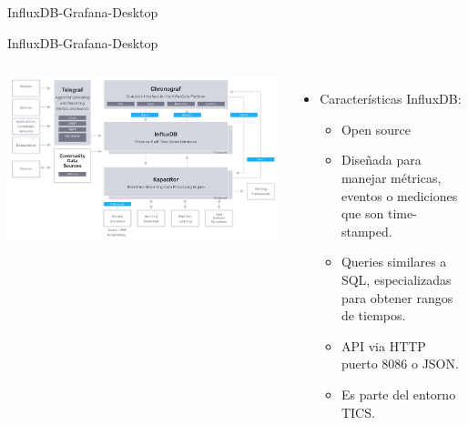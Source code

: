 \documentclass[aspectratio= 43]{beamer}
\begin{document}
\begin{frame}{InfluxDB-Grafana-Desktop}
\end{frame}

\begin{frame}{InfluxDB-Grafana-Desktop}
   \begin{columns}
      \includegraphics [scale = 0.2 ]{./Images/TICS.png}
      \begin{itemize}
       \item{Características InfluxDB:}
        \begin{itemize}
               \item {Open source}
               \item {Diseñada para manejar métricas, eventos o mediciones que son time-stamped.}
               \item {Queries similares a SQL, especializadas para obtener rangos de tiempos.}
               \item {API via HTTP puerto 8086 o JSON.}
               \item {Es parte del entorno TICS.}
        \end{itemize}
    \end{itemize}
   \end{columns}
  \end{frame}
\end{document}

